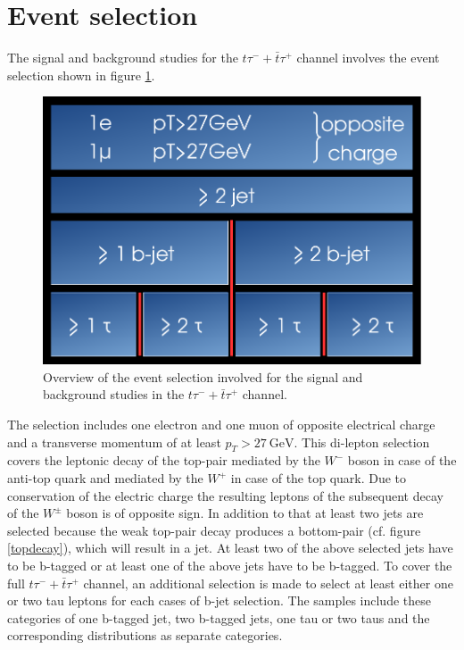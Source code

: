 \section{Event selection}\label{eventselection}
The signal and background studies for the $t\tau^{-}+\bar{t}\tau^{+}$ channel involves the event selection shown in figure \ref{selection}.\newline
%
\begin{figure}[htbp]                                 
 \begin{center}                                       
  \includegraphics[width=0.45\linewidth]{figures/selection.pdf} 
   \caption[Overview of the event selection.]{Overview of the event selection involved for the signal and background studies in the $t\tau^{-}+\bar{t}\tau^{+}$ channel.}
  \label{selection}                                    
 \end{center}
\end{figure}
%
The selection includes one electron and one muon of opposite electrical charge and a transverse momentum of at least $p_T>\SI{27}{\giga\electronvolt}$. This di-lepton selection covers the leptonic decay of the top-pair mediated by the $W^-$ boson in case of the anti-top quark and mediated by the $W^+$ in case of the top quark. Due to conservation of the electric charge the resulting leptons of the subsequent decay of the $W^\pm$ boson is of opposite sign. In addition to that at least two jets are selected because the weak top-pair decay produces a bottom-pair (cf. figure \ref{topdecay}), which will result in a jet. At least two of the above selected jets have to be b-tagged or at least one of the above jets have to be b-tagged. To cover the full $t\tau^{-}+\bar{t}\tau^{+}$ channel, an additional selection is made to select at least either one or two tau leptons for each cases of b-jet selection. The samples include these categories of one b-tagged jet, two b-tagged jets, one tau or two taus and the corresponding distributions as separate categories.
